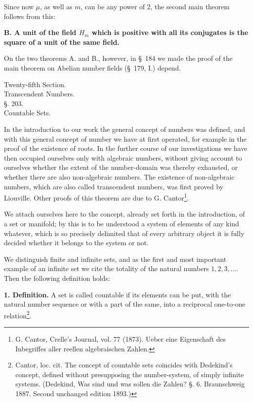 \documentclass[11pt]{article}
\begin{document}
Since now $\mu$, as well as $m$, can be any power of 2, the second main theorem follows from this:

\begin{center}\textbf{B. A unit of the field $H_m$ which is positive with all its conjugates is the square of a unit of the same field.}\end{center}

On the two theorems A. and B., however, in \S~184 we made the proof of the main theorem on Abelian number fields (\S~179, I.) depend.

\clearpage
\begin{center}
{\large Twenty-fifth Section.}\\[0.8em]
{\Large Transcendent Numbers.}\\[1.2em]
{\large §. 203.}\\[0.4em]
{\large Countable Sets.}
\end{center}

In the introduction to our work the general concept of numbers was defined, and with this general concept of number we have at first operated, for example in the proof of the existence of roots. In the further course of our investigations we have then occupied ourselves only with algebraic numbers, without giving account to ourselves whether the extent of the number-domain was thereby exhausted, or whether there are also non-algebraic numbers. The existence of non-algebraic numbers, which are also called transcendent numbers, was first proved by Liouville. Other proofs of this theorem are due to G. Cantor\footnote{G. Cantor, Crelle's Journal, vol. 77 (1873). Ueber eine Eigenschaft des Inbegriffes aller reellen algebraischen Zahlen.}.

We attach ourselves here to the concept, already set forth in the introduction, of a set or manifold; by this is to be understood a system of elements of any kind whatever, which is so precisely delimited that of every arbitrary object it is fully decided whether it belongs to the system or not.

We distinguish finite and infinite sets, and as the first and most important example of an infinite set we cite the totality of the natural numbers $1,2,3,\ldots$. Then the following definition holds:

\textbf{1. Definition.} A set is called countable if its elements can be put, with the natural number sequence
or with a part of the same, into a reciprocal one-to-one relation\footnote{Cantor, loc. cit. The concept of countable sets coincides with Dedekind's concept, defined without presupposing the number-system, of simply infinite systems. (Dedekind, Was sind und was sollen die Zahlen? §. 6. Braunschweig 1887. Second unchanged edition 1893.)}.
\end{document}
